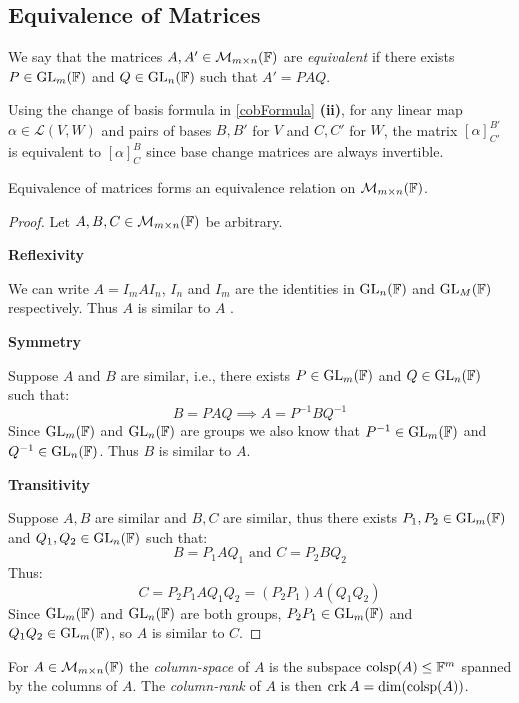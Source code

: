 \documentclass[../main.tex]{subfiles}
\begin{document}
\subsection{Equivalence of Matrices}
\begin{definition}
  We say that the matrices $A, A' \in \mathcal{M}_{m \times n}(\mathbb{F})$ are \textit{equivalent} if there exists $P \in \mathrm{GL}_m(\mathbb{F})$ and $Q \in \mathrm{GL}_n(\mathbb{F})$ such that $A' = PAQ$.
\end{definition}
\begin{example}
  Using the change of basis formula in \cref{cobFormula} \textbf{(ii)}, for any linear map $\alpha \in \mathcal{L}(V, W)$ and pairs of bases $B, B'$ for $V$ and $C, C'$ for $W$, the matrix $[\alpha]^{B'}_{C'}$ is equivalent to $[\alpha]^{B}_{C}$ since base change matrices are always invertible.
\end{example}
\begin{proposition}
  Equivalence of matrices forms an equivalence relation on $\mathcal{M}_{m \times n}(\mathbb{F})$.
\end{proposition}
\begin{proof}
  Let $A, B, C \in \mathcal{M}_{m \times n}(\mathbb{F})$ be arbitrary.

  \textbf{Reflexivity}\par
  We can write $A = I_m A I_n$, $I_n$ and $I_m $ are the identities in $\mathrm{GL}_n(\mathbb{F})$ and $\mathrm{GL}_M(\mathbb{F})$ respectively.
  Thus $A$ is similar to $A$ .

  \textbf{Symmetry}\par
  Suppose $A$ and $B$ are similar, i.e., there exists $P \in \mathrm{GL}_m(\mathbb{F})$ and $Q \in \mathrm{GL}_n(\mathbb{F})$ such that:
  \[
    B = PAQ \implies A = P^{-1} B Q^{-1}
  \]
  Since $\mathrm{GL}_m(\mathbb{F})$ and $\mathrm{GL}_n(\mathbb{F})$ are groups we also know that $P^{-1} \in \mathrm{GL}_m(\mathbb{F})$ and $Q^{-1} \in \mathrm{GL}_n(\mathbb{F})$.
  Thus $B$ is similar to $A$.

  \textbf{Transitivity}\par
  Suppose $A, B$ are similar and $B, C$ are similar, thus there exists $P_1, P_2 \in \mathrm{GL}_m(\mathbb{F})$ and $Q_1, Q_2 \in \mathrm{GL}_n(\mathbb{F})$ such that:
  \[
    B = P_1 A Q_1 \text{ and } C = P_2 B Q_2
  \]
  Thus:
  \[
    C = P_2 P_1 A Q_1 Q_2 = (P_2 P_1) A (Q_1 Q_2)
  \]
  Since $\mathrm{GL}_m(\mathbb{F})$ and $\mathrm{GL}_n(\mathbb{F})$ are both groups, $P_2 P_1 \in \mathrm{GL}_m(\mathbb{F})$ and $Q_1 Q_2 \in \mathrm{GL}_m(\mathbb{F})$, so $A$ is similar to $C$.
\end{proof}
\begin{definition}
  For $A \in \mathcal{M}_{m \times n}(\mathbb{F})$ the \textit{column-space} of $A$ is the subspace $\operatorname{colsp}(A) \leq \mathbb{F}^m$ spanned by the columns of $A$.
  The \textit{column-rank} of $A$ is then $\operatorname{crk} A = \dim(\operatorname{colsp}(A))$.
\end{definition}
\end{document}
